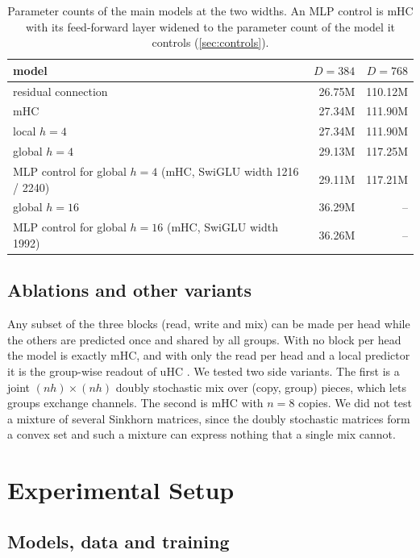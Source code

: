 \documentclass[11pt, a4paper]{article}
\begin{document}
\begin{table}[ht]
  \centering
  \caption{Parameter counts of the main models at the two widths. An MLP control is mHC with its feed-forward layer widened to
    the parameter count of the model it controls (\cref{sec:controls}).}
  \label{tab:params}
  \small
  \begin{tabular}{lrr}
    \toprule
    model & $D = 384$ & $D = 768$ \\
    \midrule
    residual connection & 26.75M & 110.12M \\
    mHC & 27.34M & 111.90M \\
    local $h = 4$ & 27.34M & 111.90M \\
    global $h = 4$ & 29.13M & 117.25M \\
    MLP control for global $h = 4$ (mHC, SwiGLU width 1216 / 2240) & 29.11M & 117.21M \\
    global $h = 16$ & 36.29M & -- \\
    MLP control for global $h = 16$ (mHC, SwiGLU width 1992) & 36.26M & -- \\
    \bottomrule
  \end{tabular}
\end{table}

\subsection{Ablations and other variants}
\label{sec:variants}

Any subset of the three blocks (read, write and mix) can be made per head while the others are predicted once and shared by all groups. With no block
per head the model is exactly mHC, and with only the read per head and a local predictor it is the group-wise readout of uHC
\citep{anon2026uhc}. We tested two side variants. The first is a joint $(nh) \times (nh)$ doubly stochastic mix over (copy, group)
pieces, which lets groups exchange channels. The second is mHC with $n = 8$ copies. We did not test a mixture of several Sinkhorn
matrices, since the doubly stochastic matrices form a convex set and such a mixture can express nothing that a single mix cannot.

\section{Experimental Setup}
\label{sec:setup}

\subsection{Models, data and training}
\label{sec:training}
\end{document}
